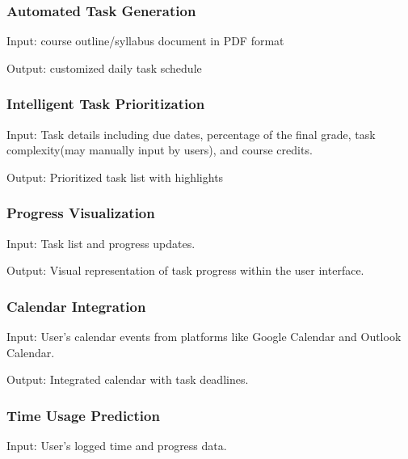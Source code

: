 \documentclass{article}
\begin{document}


\subsubsection{Automated Task Generation}
\vspace{1ex}

\noindent Input: course outline/syllabus document in PDF format

\noindent Output: customized daily task schedule
   
\subsubsection{Intelligent Task Prioritization}
\vspace{1ex}

\noindent Input: Task details including due dates, percentage of the final grade, task complexity(may manually input by users), and course credits.

\noindent Output: Prioritized task list with highlights
 
\subsubsection{Progress Visualization}
\vspace{1ex}

\noindent Input: Task list and progress updates.

\noindent Output: Visual representation of task progress within the user interface.
 
\subsubsection{Calendar Integration}
\vspace{1ex}

\noindent Input: User's calendar events from platforms like Google Calendar and Outlook Calendar.

\noindent Output: Integrated calendar with task deadlines.
 
\subsubsection{Time Usage Prediction}
\vspace{1ex}

\noindent Input: User's logged time and progress data.
\end{document}

